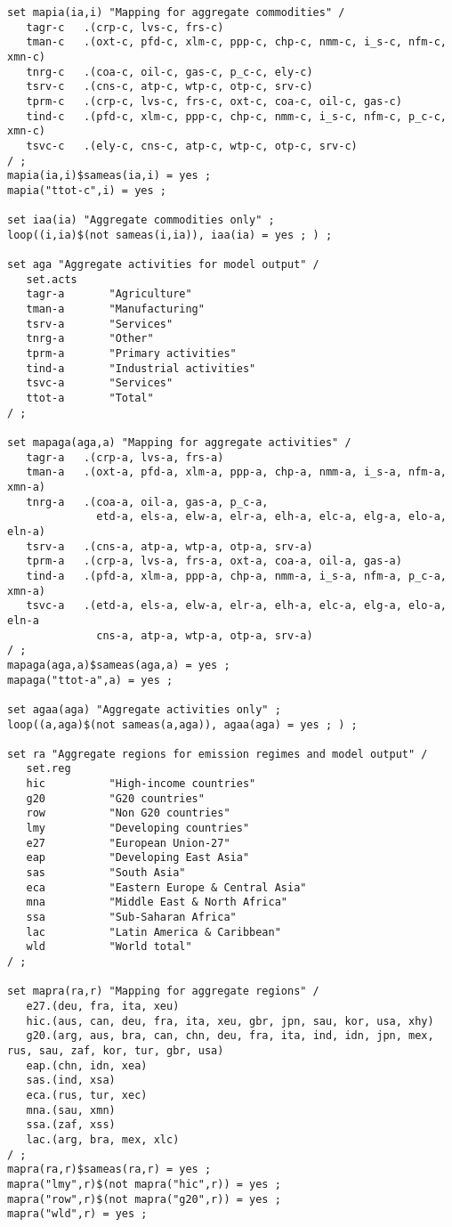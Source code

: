 \begin{lstlisting}[language=GAMS, caption={Example 'Sets' file for the \textsc{Envisage} model}, label=lst:SetsFileExample]
set mapia(ia,i) "Mapping for aggregate commodities" /
   tagr-c   .(crp-c, lvs-c, frs-c)
   tman-c   .(oxt-c, pfd-c, xlm-c, ppp-c, chp-c, nmm-c, i_s-c, nfm-c, xmn-c)
   tnrg-c   .(coa-c, oil-c, gas-c, p_c-c, ely-c)
   tsrv-c   .(cns-c, atp-c, wtp-c, otp-c, srv-c)
   tprm-c   .(crp-c, lvs-c, frs-c, oxt-c, coa-c, oil-c, gas-c)
   tind-c   .(pfd-c, xlm-c, ppp-c, chp-c, nmm-c, i_s-c, nfm-c, p_c-c, xmn-c)
   tsvc-c   .(ely-c, cns-c, atp-c, wtp-c, otp-c, srv-c)
/ ;
mapia(ia,i)$sameas(ia,i) = yes ;
mapia("ttot-c",i) = yes ;

set iaa(ia) "Aggregate commodities only" ;
loop((i,ia)$(not sameas(i,ia)), iaa(ia) = yes ; ) ;

set aga "Aggregate activities for model output" /
   set.acts
   tagr-a       "Agriculture"
   tman-a       "Manufacturing"
   tsrv-a       "Services"
   tnrg-a       "Other"
   tprm-a       "Primary activities"
   tind-a       "Industrial activities"
   tsvc-a       "Services"
   ttot-a       "Total"
/ ;

set mapaga(aga,a) "Mapping for aggregate activities" /
   tagr-a   .(crp-a, lvs-a, frs-a)
   tman-a   .(oxt-a, pfd-a, xlm-a, ppp-a, chp-a, nmm-a, i_s-a, nfm-a, xmn-a)
   tnrg-a   .(coa-a, oil-a, gas-a, p_c-a,
              etd-a, els-a, elw-a, elr-a, elh-a, elc-a, elg-a, elo-a, eln-a)
   tsrv-a   .(cns-a, atp-a, wtp-a, otp-a, srv-a)
   tprm-a   .(crp-a, lvs-a, frs-a, oxt-a, coa-a, oil-a, gas-a)
   tind-a   .(pfd-a, xlm-a, ppp-a, chp-a, nmm-a, i_s-a, nfm-a, p_c-a, xmn-a)
   tsvc-a   .(etd-a, els-a, elw-a, elr-a, elh-a, elc-a, elg-a, elo-a, eln-a
              cns-a, atp-a, wtp-a, otp-a, srv-a)
/ ;
mapaga(aga,a)$sameas(aga,a) = yes ;
mapaga("ttot-a",a) = yes ;

set agaa(aga) "Aggregate activities only" ;
loop((a,aga)$(not sameas(a,aga)), agaa(aga) = yes ; ) ;

set ra "Aggregate regions for emission regimes and model output" /
   set.reg
   hic          "High-income countries"
   g20          "G20 countries"
   row          "Non G20 countries"
   lmy          "Developing countries"
   e27          "European Union-27"
   eap          "Developing East Asia"
   sas          "South Asia"
   eca          "Eastern Europe & Central Asia"
   mna          "Middle East & North Africa"
   ssa          "Sub-Saharan Africa"
   lac          "Latin America & Caribbean"
   wld          "World total"
/ ;

set mapra(ra,r) "Mapping for aggregate regions" /
   e27.(deu, fra, ita, xeu)
   hic.(aus, can, deu, fra, ita, xeu, gbr, jpn, sau, kor, usa, xhy)
   g20.(arg, aus, bra, can, chn, deu, fra, ita, ind, idn, jpn, mex, rus, sau, zaf, kor, tur, gbr, usa)
   eap.(chn, idn, xea)
   sas.(ind, xsa)
   eca.(rus, tur, xec)
   mna.(sau, xmn)
   ssa.(zaf, xss)
   lac.(arg, bra, mex, xlc)
/ ;
mapra(ra,r)$sameas(ra,r) = yes ;
mapra("lmy",r)$(not mapra("hic",r)) = yes ;
mapra("row",r)$(not mapra("g20",r)) = yes ;
mapra("wld",r) = yes ;


\end{lstlisting}
